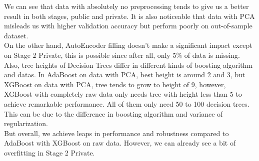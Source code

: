 \documentclass[11pt,a4paper]{article}
\begin{document}
We can see that data with absolutely no preprocessing tends to give us a better result in both stages, public and private. It is also noticeable that data with PCA misleads us with higher validation accuracy but perform poorly on out-of-sample dataset. \\
On the other hand, AutoEncoder filling doesn't make a significant impact except on Stage 2 Private, this is possible since after all, only $5\%$ of data is missing.\\
Also, tree heights of Decision Trees differ in different kinds of boosting algorithm and datas. In AdaBoost on data with PCA, best height is around 2 and 3, but XGBoost on data with PCA, tree tends to grow to height of 9, however, XGBoost with completely raw data only needs tree with height less than 5 to achieve remarkable performance. All of them only need 50 to 100 decision trees. This can be due to the difference in boosting algorithm and variance of regularization.\\
But overall, we achieve leaps in performance and robustness compared to AdaBoost with XGBoost on raw data. However, we can already see a bit of overfitting in Stage 2 Private.


\end{document}
